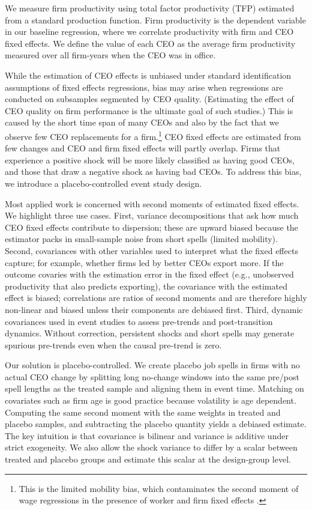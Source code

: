\documentclass[11pt,a4paper]{article}
\begin{document}
We measure firm productivity using total factor productivity (TFP) estimated from a standard production function. Firm productivity is the dependent variable in our baseline regression, where we correlate productivity with firm and CEO fixed effects. We define the value of each CEO as the average firm productivity measured over all firm-years when the CEO was in office.

While the estimation of CEO effects is unbiased under standard identification assumptions of fixed effects regressions, bias may arise when regressions are conducted on subsamples segmented by CEO quality. (Estimating the effect of CEO quality on firm performance is the ultimate goal of such studies.) This is caused by the short time span of many CEOs and also by the fact that we observe few CEO replacements for a firm.\footnote{This is the limited mobility bias, which contaminates the second moment of wage regressions in the presence of worker and firm fixed effects \cite{kline2024firm}.} CEO fixed effects are estimated from few changes and CEO and firm fixed effects will partly overlap. Firms that experience a positive shock will be more likely classified as having good CEOs, and those that draw a negative shock as having bad CEOs. To address this bias, we introduce a placebo-controlled event study design.

Most applied work is concerned with second moments of estimated fixed effects. We highlight three use cases. First, variance decompositions that ask how much CEO fixed effects contribute to dispersion; these are upward biased because the estimator packs in small-sample noise from short spells (limited mobility). Second, covariances with other variables used to interpret what the fixed effects capture; for example, whether firms led by better CEOs export more. If the outcome covaries with the estimation error in the fixed effect (e.g., unobserved productivity that also predicts exporting), the covariance with the estimated effect is biased; correlations are ratios of second moments and are therefore highly non-linear and biased unless their components are debiased first. Third, dynamic covariances used in event studies to assess pre-trends and post-transition dynamics. Without correction, persistent shocks and short spells may generate spurious pre-trends even when the causal pre-trend is zero.

Our solution is placebo-controlled. We create placebo job spells in firms with no actual CEO change by splitting long no-change windows into the same pre/post spell lengths as the treated sample and aligning them in event time. Matching on covariates such as firm age is good practice because volatility is age dependent. Computing the same second moment with the same weights in treated and placebo samples, and subtracting the placebo quantity yields a debiased estimate. The key intuition is that covariance is bilinear and variance is additive under strict exogeneity. We also allow the shock variance to differ by a scalar between treated and placebo groups and estimate this scalar at the design-group level.
\end{document}
